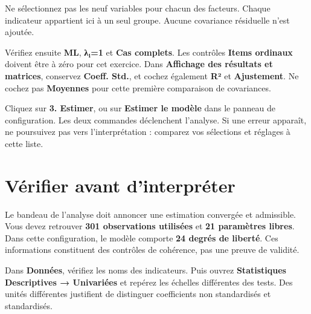 \documentclass[
  french,
  11pt,
  a4paper,
  DIV=11,
  numbers=noendperiod]{scrreprt}
\begin{document}
Ne sélectionnez pas les neuf variables pour chacun des facteurs. Chaque
indicateur appartient ici à un seul groupe. Aucune covariance résiduelle
n'est ajoutée.

Vérifiez ensuite \textbf{ML}, \textbf{λ₁=1} et \textbf{Cas complets}.
Les contrôles \textbf{Items ordinaux} doivent être à zéro pour cet
exercice. Dans \textbf{Affichage des résultats et matrices}, conservez
\textbf{Coeff. Std.}, et cochez également \textbf{R²} et
\textbf{Ajustement}. Ne cochez pas \textbf{Moyennes} pour cette première
comparaison de covariances.

Cliquez sur \textbf{3. Estimer}, ou sur \textbf{Estimer le modèle} dans
le panneau de configuration. Les deux commandes déclenchent l'analyse.
Si une erreur apparaît, ne poursuivez pas vers l'interprétation :
comparez vos sélections et réglages à cette liste.

\section{Vérifier avant
d'interpréter}\label{vuxe9rifier-avant-dinterpruxe9ter}

Le bandeau de l'analyse doit annoncer une estimation convergée et
admissible. Vous devez retrouver \textbf{301 observations utilisées} et
\textbf{21 paramètres libres}. Dans cette configuration, le modèle
comporte \textbf{24 degrés de liberté}. Ces informations constituent des
contrôles de cohérence, pas une preuve de validité.

Dans \textbf{Données}, vérifiez les noms des indicateurs. Puis ouvrez
\textbf{Statistiques Descriptives → Univariées} et repérez les échelles
différentes des tests. Des unités différentes justifient de distinguer
coefficients non standardisés et standardisés.

\end{document}
